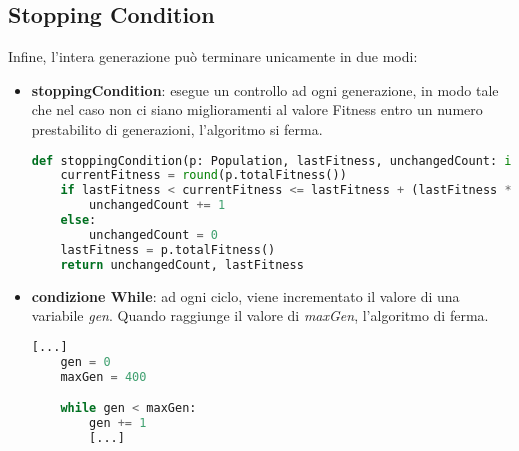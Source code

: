 \documentclass{article}
\begin{document}
\subsection{Stopping Condition}
Infine, l'intera generazione può terminare unicamente in due modi:
\begin{itemize}
    \item \textbf{stoppingCondition}: esegue un controllo ad ogni generazione, in modo tale che nel caso non ci siano miglioramenti al valore Fitness entro un numero prestabilito di generazioni, l'algoritmo si ferma.
\begin{lstlisting}[language = Python]
def stoppingCondition(p: Population, lastFitness, unchangedCount: int, increaseRate: float) -> tuple[int, int]:
    currentFitness = round(p.totalFitness())
    if lastFitness < currentFitness <= lastFitness + (lastFitness * increaseRate):
        unchangedCount += 1
    else:
        unchangedCount = 0
    lastFitness = p.totalFitness()
    return unchangedCount, lastFitness
\end{lstlisting}
\end{itemize}
\begin{itemize}
    \item \textbf{condizione While}: ad ogni ciclo, viene incrementato il valore di una variabile \textit{gen}. Quando raggiunge il valore di \textit{maxGen}, l'algoritmo di ferma.
\begin{lstlisting}[language = Python]
    [...]
    gen = 0
    maxGen = 400

    while gen < maxGen:
        gen += 1
        [...]
\end{lstlisting}
    
\end{itemize}
\pagebreak
\end{document}

